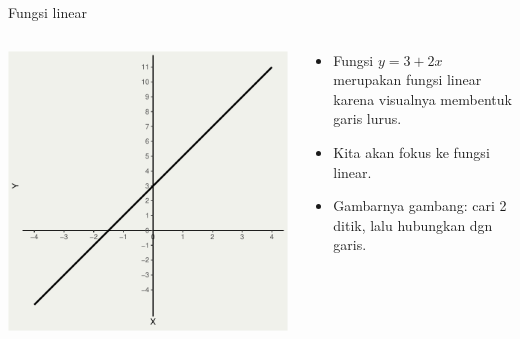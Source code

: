 \documentclass[
  ignorenonframetext,
]{beamer}
\begin{document}
\begin{frame}{Fungsi linear}
\label{fungsi-linear}
\begin{columns}[T]
\begin{column}{0.47\textwidth}
\includegraphics{index_files/figure-beamer/unnamed-chunk-4-1.pdf}
\end{column}

\begin{column}{0.47\textwidth}
\begin{itemize}
\item
  Fungsi \(y=3+2x\) merupakan fungsi linear karena visualnya membentuk
  garis lurus.
\item
  Kita akan fokus ke fungsi linear.
\item
  Gambarnya gambang: cari 2 ditik, lalu hubungkan dgn garis.
\end{itemize}
\end{column}
\end{columns}
\end{frame}
\end{document}
